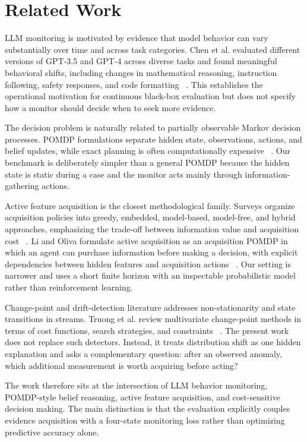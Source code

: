 \documentclass{article}
\begin{document}
\section{Related Work}

LLM monitoring is motivated by evidence that model behavior can vary substantially over time and across task categories. Chen et al. evaluated different versions of GPT-3.5 and GPT-4 across diverse tasks and found meaningful behavioral shifts, including changes in mathematical reasoning, instruction following, safety responses, and code formatting ~. This establishes the operational motivation for continuous black-box evaluation but does not specify how a monitor should decide when to seek more evidence.

The decision problem is naturally related to partially observable Markov decision processes. POMDP formulations separate hidden state, observations, actions, and belief updates, while exact planning is often computationally expensive ~. Our benchmark is deliberately simpler than a general POMDP because the hidden state is static during a case and the monitor acts mainly through information-gathering actions.

Active feature acquisition is the closest methodological family. Surveys organize acquisition policies into greedy, embedded, model-based, model-free, and hybrid approaches, emphasizing the trade-off between information value and acquisition cost ~. Li and Oliva formulate active acquisition as an acquisition POMDP in which an agent can purchase information before making a decision, with explicit dependencies between hidden features and acquisition actions ~. Our setting is narrower and uses a short finite horizon with an inspectable probabilistic model rather than reinforcement learning.

Change-point and drift-detection literature addresses non-stationarity and state transitions in streams. Truong et al. review multivariate change-point methods in terms of cost functions, search strategies, and constraints ~. The present work does not replace such detectors. Instead, it treats distribution shift as one hidden explanation and asks a complementary question: after an observed anomaly, which additional measurement is worth acquiring before acting?

The work therefore sits at the intersection of LLM behavior monitoring, POMDP-style belief reasoning, active feature acquisition, and cost-sensitive decision making. The main distinction is that the evaluation explicitly couples evidence acquisition with a four-state monitoring loss rather than optimizing predictive accuracy alone.
\end{document}
